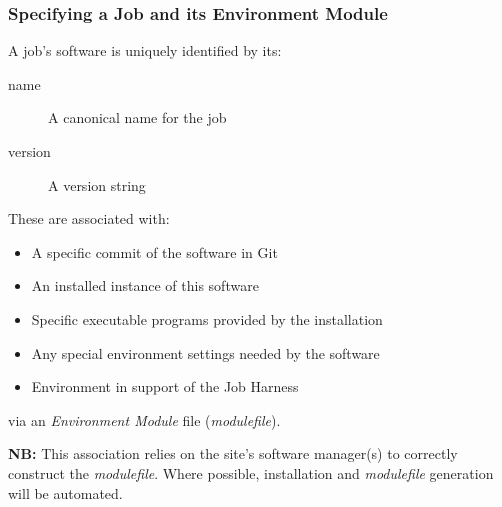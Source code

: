 \documentclass[xcolor=dvipsnames]{beamer}
\begin{document}
\begin{frame}
  \frametitle{Specifying a Job and its Environment Module}
  
  A job's software is uniquely identified by its:

  \begin{description}
  \item[name] A canonical name for the job
  \item[version] A version string
  \end{description}

  These are associated with:

  \begin{itemize}
  \item A specific commit of the software in Git
  \item An installed instance of this software
  \item Specific executable programs provided by the installation
  \item Any special environment settings needed by the software
  \item Environment in support of the Job Harness
  \end{itemize}

  via an \textit{Environment Module} file (\textit{modulefile}).

  \vspace{5mm}

  \textbf{NB:} This association relies on the site's software
  manager(s) to correctly construct the \textit{modulefile}.  Where
  possible, installation and \textit{modulefile} generation will be
  automated.

\end{frame}
\end{document}
